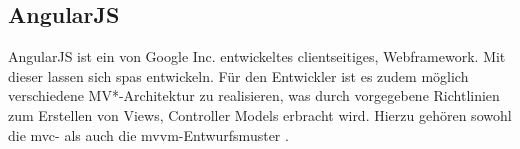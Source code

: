 \subsection{AngularJS}
\label{sec:angularjs}
AngularJS ist ein von Google Inc. entwickeltes clientseitiges, Webframework. Mit dieser lassen sich \ac{spa}s entwickeln. Für den Entwickler ist es zudem möglich verschiedene MV*-Architektur zu realisieren, was durch vorgegebene Richtlinien zum Erstellen von Views, Controller Models erbracht wird. Hierzu gehören sowohl die \ac{mvc}- als auch die \ac{mvvm}-Entwurfsmuster \cite{ste15}.











%